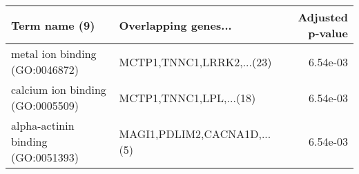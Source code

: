 \begin{tabular}{llr}
\toprule
                     Term name (9) &        Overlapping genes... &  Adjusted p-value \\
\midrule
    metal ion binding (GO:0046872) &   MCTP1,TNNC1,LRRK2,...(23) &          6.54e-03 \\
  calcium ion binding (GO:0005509) &     MCTP1,TNNC1,LPL,...(18) &          6.54e-03 \\
alpha-actinin binding (GO:0051393) & MAGI1,PDLIM2,CACNA1D,...(5) &          6.54e-03 \\
\bottomrule
\end{tabular}
